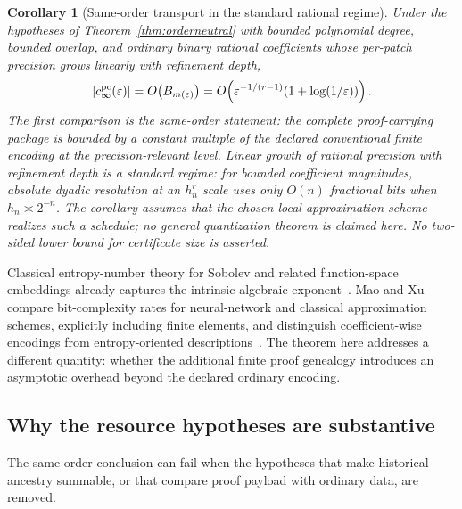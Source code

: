 \documentclass[11pt]{article}
\newtheorem{corollary}[theorem]{Corollary}
\theoremstyle{definition}
\begin{document}
\begin{corollary}[Same-order transport in the standard rational regime]\label{cor:orderneutral}
Under the hypotheses of Theorem~\ref{thm:orderneutral} with bounded polynomial degree,
bounded overlap, and ordinary binary rational coefficients whose per-patch precision grows
linearly with refinement depth,
\[
 |c_\infty^{\rm pc}(\varepsilon)|
 =O\!\left(B_{m(\varepsilon)}\right)
 =O\!\left(\varepsilon^{-1/(r-1)}(1+\log(1/\varepsilon))\right).
\]
The first comparison is the same-order statement: the complete proof-carrying package is
bounded by a constant multiple of the declared conventional finite encoding at the
precision-relevant level.  Linear growth of rational precision with refinement depth is a standard regime: for
bounded coefficient magnitudes, absolute dyadic resolution at an $h_n^r$ scale uses only
$O(n)$ fractional bits when $h_n\asymp2^{-n}$.  The corollary assumes that the chosen
local approximation scheme realizes such a schedule; no general quantization theorem is
claimed here.  No two-sided lower bound for certificate size is asserted.
\end{corollary}

Classical entropy-number theory for Sobolev and related function-space embeddings already
captures the intrinsic algebraic exponent~\cite{EdmundsTriebel}.  Mao and Xu compare
bit-complexity rates for neural-network and classical approximation schemes, explicitly
including finite elements, and distinguish coefficient-wise encodings from entropy-oriented
descriptions~\cite{MaoXu2026}.  The theorem here addresses a different quantity: whether the
additional finite proof genealogy introduces an asymptotic overhead beyond the declared
ordinary encoding.

\subsection{Why the resource hypotheses are substantive}

The same-order conclusion can fail when the hypotheses that make historical ancestry
summable, or that compare proof payload with ordinary data, are removed.
\end{document}
